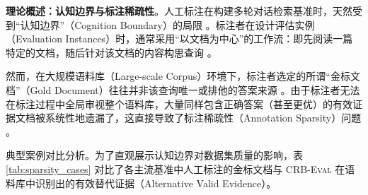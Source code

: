 \textbf{理论概述：认知边界与标注稀疏性}。人工标注在构建多轮对话检索基准时，天然受到“认知边界”（Cognition Boundary）的局限 。标注者在设计评估实例（Evaluation Instances）时，通常采用“以文档为中心”的工作流：即先阅读一篇特定的文档，随后针对该文档的内容构思查询 。

然而，在大规模语料库（Large-scale Corpus）环境下，标注者选定的所谓“金标文档”（Gold Document）往往并非该查询唯一或排他的答案来源 。由于标注者无法在标注过程中全局审视整个语料库，大量同样包含正确答案（甚至更优）的有效证据文档被系统性地遗漏了，这直接导致了标注稀疏性（Annotation Sparsity）问题 。

\textbf{}{典型案例对比分析。}为了直观展示认知边界对数据集质量的影响，表 \ref{tab:sparsity_cases} 对比了各主流基准中人工标注的金标文档与 \textsc{CRB-Eval} 在语料库中识别出的有效替代证据（Alternative Valid Evidence）。

